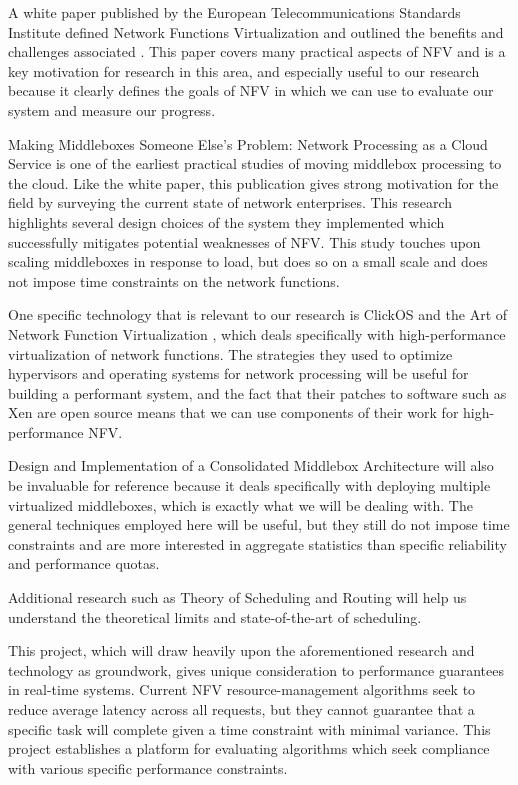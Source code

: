 \documentclass{sig-alternate}
\begin{document}
A white paper published by the European Telecommunications Standards Institute defined Network Functions Virtualization and outlined the benefits and challenges associated \cite{white_paper}. This paper covers many practical aspects of NFV and is a key motivation for research in this area, and especially useful to our research because it clearly defines the goals of NFV in which we can use to evaluate our system and measure our progress.

Making Middleboxes Someone Else's Problem: Network Processing as a Cloud Service \cite{Sherry:2012:MMS:2342356.2342359} is one of the earliest practical studies of moving middlebox processing to the cloud. Like the white paper, this publication gives strong motivation for the field by surveying the current state of network enterprises. This research highlights several design choices of the system they implemented which successfully mitigates potential weaknesses of NFV. This study touches upon scaling middleboxes in response to load, but does so on a small scale and does not impose time constraints on the network functions.

One specific technology that is relevant to our research is ClickOS and the Art of Network Function Virtualization \cite{179771}, which deals specifically with high-performance virtualization of network functions. The strategies they used to optimize hypervisors and operating systems for network processing will be useful for building a performant system, and the fact that their patches to software such as Xen are open source means that we can use components of their work for high-performance NFV.

Design and Implementation of a Consolidated Middlebox Architecture \cite{Sekar:2012:DIC:2228298.2228331} will also be invaluable for reference because it deals specifically with deploying multiple virtualized middleboxes, which is exactly what we will be dealing with. The general techniques employed here will be useful, but they still do not impose time constraints and are more interested in aggregate statistics than specific reliability and performance quotas.

Additional research such as Theory of Scheduling and Routing \cite{DBLP:conf/fsttcs/BampisKLLS13} will help us understand the theoretical limits and state-of-the-art of scheduling.

This project, which will draw heavily upon the aforementioned research and technology as groundwork, gives unique consideration to performance guarantees in real-time systems. Current NFV resource-management algorithms seek to reduce average latency across all requests, but they cannot guarantee that a specific task will complete given a time constraint with minimal variance. This project establishes a platform for evaluating algorithms which seek compliance with various specific performance constraints.
\end{document}
